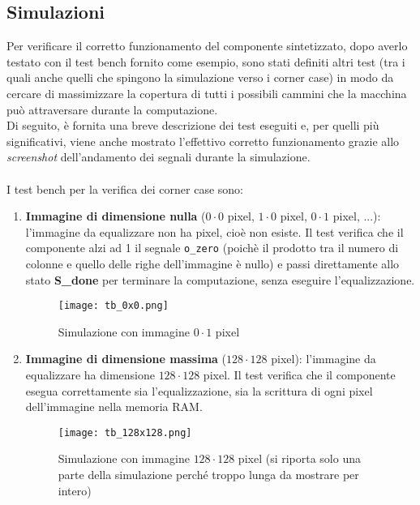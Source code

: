 \documentclass{article}
\begin{document}
\subsection{Simulazioni}
Per verificare il corretto funzionamento del componente sintetizzato, dopo averlo testato con il test bench fornito come esempio, sono stati definiti altri test (tra i quali anche quelli che spingono la simulazione verso i corner case) in modo da cercare di massimizzare la copertura di tutti i possibili cammini che la macchina può attraversare durante la computazione. \\
Di seguito, è fornita una breve descrizione dei test eseguiti e, per quelli più significativi, viene anche mostrato l'effettivo corretto funzionamento grazie allo \textit{screenshot} dell'andamento dei segnali durante la simulazione. \\ \\
I test bench per la verifica dei corner case sono:
\vspace{0.2cm}
\begin{enumerate}
	\item \textbf{Immagine di dimensione nulla} ($0\cdot0$ pixel, $1\cdot0$ pixel, $0\cdot1$ pixel, ...): l'immagine da equalizzare non ha pixel, cioè non esiste. Il test verifica che il componente alzi ad 1 il segnale \verb^o_zero^ (poichè il prodotto tra il numero di colonne e quello delle righe dell'immagine è nullo) e passi direttamente allo stato \textbf{S\_done} per terminare la computazione, senza eseguire l'equalizzazione.
	\vspace{0.1cm}
	\begin{figure}[H]
		\centering
		\texttt{[image: tb\_0x0.png]}
		\caption{Simulazione con immagine $0\cdot1$ pixel}
		\label{fig:TB0x0}
	\end{figure}

	\item \textbf{Immagine di dimensione massima} ($128\cdot128$ pixel): l'immagine da equalizzare ha dimensione $128\cdot128$ pixel. Il test verifica che il componente esegua correttamente sia l'equalizzazione, sia la scrittura di ogni pixel dell'immagine nella memoria RAM.
	\vspace{0.1cm}
	\begin{figure}[H]
		\centering
		\texttt{[image: tb\_128x128.png]}
		\caption{Simulazione con immagine $128\cdot128$ pixel (si riporta solo una parte della simulazione perché troppo lunga da mostrare per intero)}
		\label{fig:TB128x128}
	\end{figure}
\end{enumerate}
\end{document}
